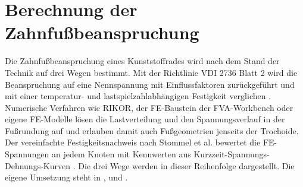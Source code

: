 
\section{Berechnung der Zahnfußbeanspruchung}
\label{sec:berechnung_stand}

Die Zahnfußbeanspruchung eines Kunststoffrades wird nach dem Stand der Technik auf drei Wegen bestimmt. Mit der Richtlinie VDI 2736 Blatt 2 wird die Beanspruchung auf eine Nennspannung mit Einflussfaktoren zurückgeführt und mit einer temperatur- und lastspielzahlabhängigen Festigkeit verglichen \cite[S.~11 bis 15]{VDI2736-2}. Numerische Verfahren wie RIKOR, der FE-Baustein der FVA-Workbench oder eigene FE-Modelle lösen die Lastverteilung und den Spannungsverlauf in der Fußrundung auf und erlauben damit auch Fußgeometrien jenseits der Trochoide. Der vereinfachte Festigkeitsnachweis nach Stommel et al. bewertet die FE-Spannungen an jedem Knoten mit Kennwerten aus Kurzzeit-Spannungs-Dehnungs-Kurven \cite[Kap.~6]{Sto18}. Die drei Wege werden in dieser Reihenfolge dargestellt. Die eigene Umsetzung steht in ,  und .


